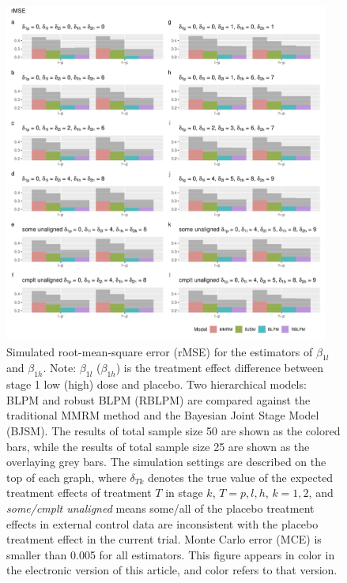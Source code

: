 \begin{figure}
\includegraphics[width=0.95\textwidth]{chapters/figures/rMSE_longitudinal.pdf}
\caption{Simulated root-mean-square error (rMSE) for the estimators of $\beta_{1l}$ and $\beta_{1h}$. \protect \linebreak Note: $\beta_{1l}$ ($\beta_{1h}$) is the treatment effect difference between stage 1 low (high) dose and placebo. Two hierarchical models: \ac{BLPM} and robust \ac{BLPM} (RBLPM) are compared against the traditional MMRM method and the Bayesian Joint Stage Model (BJSM). The results of total sample size 50 are shown as the colored bars, while the results of total sample size 25 are shown as the overlaying grey bars. The simulation settings are described on the top of each graph, where $\delta_{Tk}$ denotes the true value of the expected treatment effects of treatment $T$ in stage $k$, $T = p, l, h$, $k = 1, 2$, and \emph{some/cmplt unaligned} means some/all of the placebo treatment effects in external control data are inconsistent with the placebo treatment effect in the current trial. Monte Carlo error (MCE) is smaller than 0.005 for all estimators. This figure appears in color in the electronic version of this article, and color refers to that version.}
\label{fig:rMSE_longitudinal}
\end{figure}



